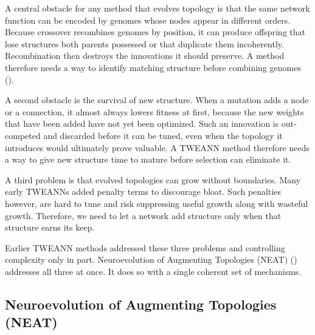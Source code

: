 \documentclass[12pt]{article}
\begin{document}
A central obstacle for any method that evolves topology is that the same network function can be encoded by genomes whose nodes appear in different orders.
Because crossover recombines genomes by position, it can produce offspring that lose structures both parents possessed or that duplicate them incoherently.
Recombination then destroys the innovations it should preserve.
A method therefore needs a way to identify matching structure before combining genomes (\cite{stanley_evolving_2002}).

A second obstacle is the survival of new structure.
When a mutation adds a node or a connection, it almost always lowers fitness at first, because the new weights that have been added have not yet been optimized.
Such an innovation is out-competed and discarded before it can be tuned, even when the topology it introduces would ultimately prove valuable.
A TWEANN method therefore needs a way to give new structure time to mature before selection can eliminate it.

A third problem is that evolved topologies can grow without boundaries.
Many early TWEANNs added penalty terms to discourage bloat.
Such penalties however, are hard to tune and risk suppressing useful growth along with wasteful growth.
Therefore, we need to let a network add structure only when that structure earns its keep.

Earlier TWEANN methods addressed these three problems and controlling complexity only in part.
Neuroevolution of Augmenting Topologies (NEAT) (\cite{stanley_evolving_2002}) addresses all three at once.
It does so with a single coherent set of mechanisms.


\subsection{Neuroevolution of Augmenting Topologies (NEAT)}
\label{subsec:neuroevolution-of-augmenting-topologies-neat}
\end{document}
